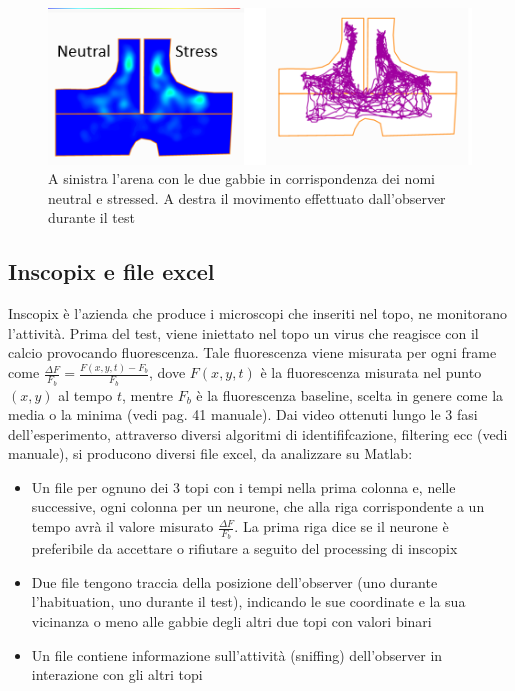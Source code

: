 \documentclass[a4paper]{article}
\begin{document}
	
	\begin{figure}[H]
		\begin{center}
			\includegraphics[scale=.80]{arena.png} 
		\end{center} 
		\caption{A sinistra l'arena con le due gabbie in corrispondenza dei nomi neutral e stressed. A destra il movimento effettuato dall'observer durante il test}
	\end{figure}

\newpage

\subsection{Inscopix e file excel}

Inscopix è l'azienda che produce i microscopi che inseriti nel topo, ne monitorano l'attività. Prima del test, viene iniettato nel topo un virus che reagisce con il calcio provocando fluorescenza. Tale fluorescenza viene misurata per ogni frame come $\frac{\Delta F}{F_b} = \frac{F(x,y,t)-F_b}{F_b}$, dove $F(x,y,t)$ è la fluorescenza misurata nel punto $(x,y)$ al tempo $t$, mentre $F_b$ è la fluorescenza baseline, scelta in genere come la media o la minima (vedi pag. 41 manuale). Dai video ottenuti lungo le 3 fasi dell'esperimento, attraverso diversi algoritmi di identififcazione, filtering ecc (vedi manuale), si producono diversi file excel, da analizzare su Matlab:
\begin{itemize}
	\item Un file per ognuno dei 3 topi con i tempi nella prima colonna e, nelle successive, ogni colonna per un neurone, che alla riga corrispondente a un tempo avrà il valore misurato  $\frac{\Delta F}{F_b}$. La prima riga dice se il neurone è preferibile da accettare o rifiutare a seguito del processing di inscopix
	
	\item  Due file tengono traccia della posizione dell'observer (uno durante l'habituation, uno durante il test), indicando le sue coordinate e la sua vicinanza o meno alle gabbie degli altri due topi con valori binari
	
	\item Un file contiene informazione sull'attività (sniffing) dell'observer in interazione con gli altri topi
	
\end{itemize}
\end{document}
